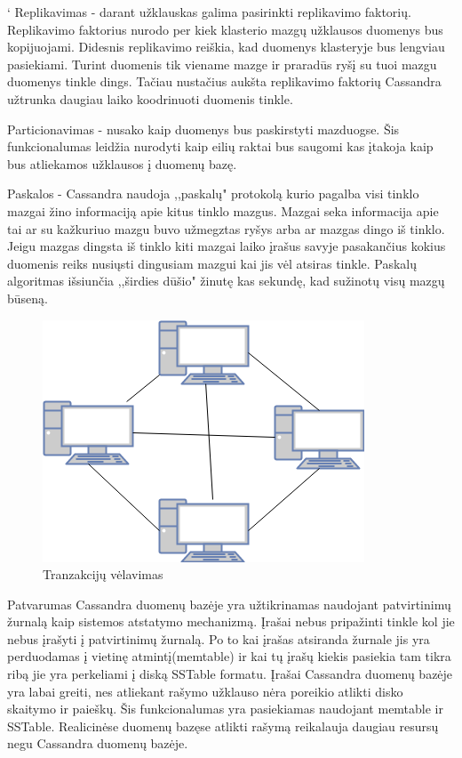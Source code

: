 \documentclass{VUMIFPSkursinis}
\begin{document}
`		Replikavimas - darant užklauskas galima pasirinkti replikavimo faktorių. Replikavimo faktorius nurodo per kiek klasterio mazgų užklausos duomenys bus kopijuojami. Didesnis replikavimo reiškia, kad duomenys klasteryje bus lengviau pasiekiami. Turint duomenis tik viename mazge ir praradūs ryšį su tuoi mazgu duomenys tinkle dings. Tačiau nustačius aukšta replikavimo faktorių Cassandra užtrunka daugiau laiko koodrinuoti duomenis tinkle. 
		\par
		Particionavimas - nusako kaip duomenys bus paskirstyti mazduogse. Šis funkcionalumas leidžia nurodyti kaip eilių raktai bus saugomi kas įtakoja kaip bus atliekamos užklausos į duomenų bazę.
		\par
		Paskalos - Cassandra naudoja ,,paskalų" protokolą kurio pagalba visi tinklo mazgai žino informaciją apie kitus tinklo mazgus. Mazgai seka informacija apie tai ar su kažkuriuo mazgu buvo užmegztas ryšys arba ar mazgas dingo iš tinklo. Jeigu mazgas dingsta iš tinklo kiti mazgai laiko įrašus savyje pasakančius kokius duomenis reiks nusiųsti dingusiam mazgui kai jis vėl atsiras tinkle. Paskalų algoritmas išsiunčia ,,širdies dūšio" žinutę kas sekundę, kad sužinotų visų mazgų būseną.
		\begin{figure}[H]
		    \centering
		    \includegraphics[scale=0.6]{img/Gos}
		    \caption{Tranzakcijų vėlavimas}   %
		    \label{img:mlp}
		\end{figure}

		Patvarumas Cassandra duomenų bazėje yra užtikrinamas naudojant patvirtinimų žurnalą kaip sistemos atstatymo mechanizmą. Įrašai nebus pripažinti tinkle kol jie nebus įrašyti į patvirtinimų žurnalą. Po to kai įrašas atsiranda žurnale jis yra perduodamas į vietinę atmintį(memtable) ir kai tų įrašų kiekis pasiekia tam tikra ribą jie yra perkeliami į diską SSTable formatu.
		\linebreak
		Įrašai Cassandra duomenų bazėje yra labai greiti, nes atliekant rašymo užklauso nėra poreikio atlikti disko skaitymo ir paieškų. Šis funkcionalumas yra pasiekiamas naudojant memtable ir SSTable. Realicinėse duomenų bazęse atlikti rašymą reikalauja daugiau resursų negu Cassandra duomenų bazėje.
\end{document}
